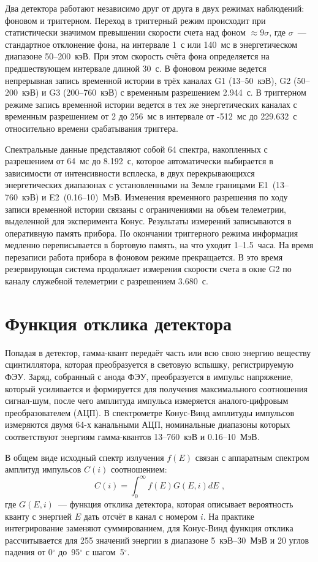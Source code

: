 Два детектора работают независимо друг от друга в двух режимах наблюдений: 
фоновом и триггерном. Переход в триггерный режим происходит при статистически 
значимом превышении скорости счета над фоном $\approx 9 \sigma$, 
где $\sigma$~--- стандартное отклонение фона, на интервале 1~с или 140~мс 
в энергетическом диапазоне 50--200~кэВ. При этом скорость счёта фона 
определяется на предшествующем интервале длиной 30~с. В фоновом режиме ведется 
непрерывная запись временной истории в трёх каналах G1 (13--50~кэВ), G2 (50--200~кэВ) 
и G3 (200--760~кэВ) с временным разрешением 2.944~с. В триггерном режиме запись 
временной истории ведется в тех же энергетических каналах с временным разрешением 
от 2 до 256~мс в интервале от -512~мс до 229.632~с относительно времени срабатывания 
триггера.

Спектральные данные представляют собой 64 спектра, накопленных с разрешением от 64~мс до 8.192~с, 
которое автоматически выбирается в зависимости от интенсивности всплеска, 
в двух перекрывающихся энергетических диапазонах с установленными на Земле границами 
E1~(13--760~кэВ) и E2~(0.16--10)~МэВ. Изменения временного разрешения 
по ходу записи временной истории связаны с ограничениями на объем телеметрии, 
выделенной для эксперимента Конус. Результаты измерений записываются в оперативную 
память прибора. По окончании триггерного режима информация медленно переписывается 
в бортовую память, на что уходит 1--1.5~часа. На время перезаписи работа прибора 
в фоновом режиме прекращается. В это время резервирующая система продолжает измерения
скорости счета в окне G2 по каналу служебной телеметрии с разрешением 3.680~с.

\section{Функция отклика детектора}
Попадая в детектор, гамма-квант передаёт часть или всю свою энергию веществу 
сцинтиллятора, которая преобразуется в световую вспышку, регистрируемую ФЭУ. 
Заряд, собранный с анода ФЭУ, преобразуется в импульс напряжение, который усиливается и формируется для получения 
максимального соотношения сигнал-шум, после чего амплитуда импульса измеряется 
аналого-цифровым преобразователем (АЦП). В спектрометре Конус-Винд амплитуды импульсов 
измеряются двумя 64-х канальными АЦП, номинальные диапазоны которых 
соответствуют энергиям гамма-квантов 13--760~кэВ и 0.16--10~МэВ.

В общем виде исходный спектр излучения $f(E)$ связан с аппаратным спектром амплитуд 
импульсов $C(i)$ соотношением:
\begin{equation}\label{eq:response}
    C(i)=\int_{0}^{\infty} f(E)G(E,i) dE \mbox{ ,}
\end{equation}
где $G(E,i)$~--- функция отклика детектора, которая описывает вероятность кванту 
с энергией $E$ дать отсчёт в канал с номером $i$. На практике интегрирование 
заменяют суммированием, для Конус-Винд функция отклика рассчитывается для 255 
значений энергии в диапазоне 5~кэВ--30~МэВ и 20 углов падения 
от 0$^\circ$ до~95$^\circ$ с шагом~5$^\circ$.

